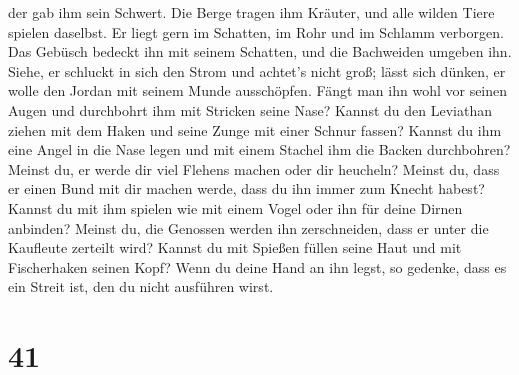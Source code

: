 der gab ihm sein Schwert.  Die Berge tragen ihm Kräuter,
und alle wilden Tiere spielen daselbst.  Er liegt gern im
Schatten, im Rohr und im Schlamm verborgen.  Das Gebüsch
bedeckt ihn mit seinem Schatten, und die Bachweiden umgeben ihn.
 Siehe, er schluckt in sich den Strom und achtet's nicht
groß; lässt sich dünken, er wolle den Jordan mit seinem Munde
ausschöpfen.  Fängt man ihn wohl vor seinen Augen und
durchbohrt ihm mit Stricken seine Nase?  Kannst du den
Leviathan ziehen mit dem Haken und seine Zunge mit einer Schnur fassen?
 Kannst du ihm eine Angel in die Nase legen und mit einem
Stachel ihm die Backen durchbohren?  Meinst du, er werde
dir viel Flehens machen oder dir heucheln?  Meinst du,
dass er einen Bund mit dir machen werde, dass du ihn immer zum Knecht
habest?  Kannst du mit ihm spielen wie mit einem Vogel
oder ihn für deine Dirnen anbinden?  Meinst du, die
Genossen werden ihn zerschneiden, dass er unter die Kaufleute zerteilt
wird?  Kannst du mit Spießen füllen seine Haut und mit
Fischerhaken seinen Kopf?  Wenn du deine Hand an ihn
legst, so gedenke, dass es ein Streit ist, den du nicht ausführen wirst.

\hypertarget{section-40}{%
\section{41}\label{section-40}}

